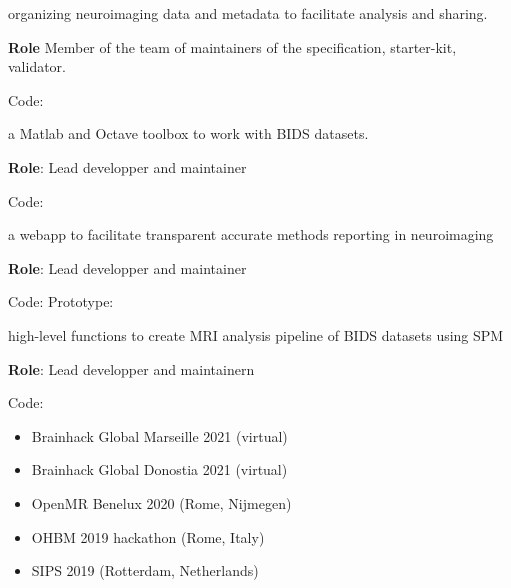 
 organizing neuroimaging data and metadata to facilitate analysis and sharing.
    
\textbf{Role} Member of the team of maintainers of the specification, starter-kit, validator.

\textbullet Code: 

\vspace{5mm}


 a Matlab and Octave toolbox to work with BIDS datasets.
    
\textbf{Role}: Lead developper and maintainer

\textbullet Code: 

\vspace{5mm}


 a webapp to facilitate transparent accurate methods reporting in neuroimaging

\textbf{Role}: Lead developper and maintainer

\textbullet Code:  
\textbullet {}
\textbullet Prototype: 

\vspace{5mm}


 high-level functions to create MRI analysis pipeline of BIDS datasets using SPM

\textbf{Role}: Lead developper and maintainern

\textbullet Code: 

\vspace{5mm}
    


\begin{itemize}
    \item Brainhack Global Marseille 2021 (virtual) 
    \item Brainhack Global Donostia 2021 (virtual) 
    \item OpenMR Benelux 2020 (Rome, Nijmegen) 
    \item OHBM 2019 hackathon (Rome, Italy) 
\end{itemize}

\begin{itemize}
    \item SIPS 2019 (Rotterdam, Netherlands) 
\end{itemize}

